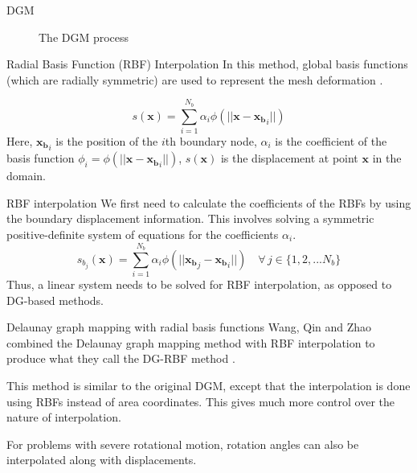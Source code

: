 \documentclass[mathserif]{beamer}
\begin{document}
\begin{frame}{DGM}
\begin{figure}
{	}
	\caption{The DGM process}
\end{figure}

\end{frame}

\begin{frame}{Radial Basis Function (RBF) Interpolation}
In this method, global basis functions (which are radially symmetric) are used to represent the mesh deformation \cite{rbf}.

\begin{equation}
s(\mathbf{x}) = \sum_{i=1}^{N_b} \alpha_i \phi(||\mathbf{x}-\mathbf{x_{b}}_i||)
\end{equation}
Here, $\mathbf{x_{b}}_i$ is the position of the $i$th boundary node, $\alpha_i$ is the coefficient of the basis function $\phi_i = \phi(||\mathbf{x}-\mathbf{x_{b}}_i||)$, $s(\mathbf{x})$ is the displacement at point $\mathbf{x}$ in the domain.
\end{frame}

\begin{frame}{RBF interpolation}
We first need to calculate the coefficients of the RBFs by using the boundary displacement information. This involves solving a symmetric positive-definite system of equations for the coefficients $\alpha_i$.
\begin{equation}
s_{b_j}(\mathbf{x}) = \sum_{i=1}^{N_b} \alpha_i \phi(||\mathbf{x_{b}}_j-\mathbf{x_{b}}_i||) \quad \forall \, j \in \{1,2,...N_b \}
\end{equation}
Thus, a linear system needs to be solved for RBF interpolation, as opposed to DG-based methods.
\end{frame}

\begin{frame}{Delaunay graph mapping with radial basis functions}
Wang, Qin and Zhao combined the Delaunay graph mapping method with RBF interpolation to produce what they call the DG-RBF method \cite{dgrbf}.

This method is similar to the original DGM, except that the interpolation is done using RBFs instead of area coordinates. This gives much more control over the nature of interpolation.

For problems with severe rotational motion, rotation angles can also be interpolated along with displacements.
\end{frame}
\end{document}
